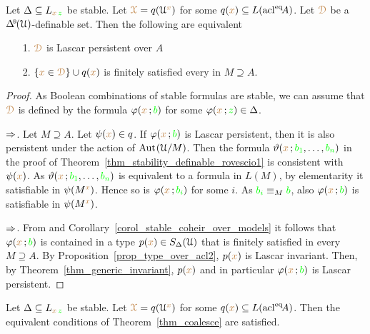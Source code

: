 \begin{corollary}\label{corol_persistent_finsat}
  Let $\Delta\subseteq L_{{\color{brown} x}\,{\color{green} z}}$ be stable.
  Let ${\color{brown}\EuScript X}= q(\EuScript U^{\color{brown} x})$ for some $q({\color{brown} x})\subseteq L({\rm acl}^{{\rm eq}}\!A)$.
  Let ${\color{brown}\EuScript D}$ be a $\BDelta(\U)$-definable set.
  Then the following are equivalent 
  \begin{itemize}
    \item[1.] ${\color{brown}\EuScript D}$ is Lascar persistent over $A$
    \item[2.] $\{{\color{brown} x}\in{\color{brown}\EuScript D}\}\cup q({\color{brown} x})$ is finitely satisfied every in $M\supseteq A$.
  \end{itemize}
\end{corollary}
\begin{proof}
  As Boolean combinations of stable formulas are stable, we can assume that ${\color{brown}\EuScript D}$ is defined by the formula $\varphi({\color{brown} x}\,;{\color{green} b})$ for some $\varphi({\color{brown} x}\,;{\color{green} z})\in\Delta$.

  $\Rightarrow$.
  Let $M\supseteq A$.
  Let $\psi({\color{brown} x})\in q$.
  If $\varphi({\color{brown} x}\,;{\color{green} b})$ is Lascar persistent, then it is also persistent under the action of ${\rm Aut\kern.15ex}(\EuScript U/M)$.
  Then the formula $\vartheta({\color{brown} x}\,;{\color{green} b_1},\dots,{\color{green} b_n})$ in the proof of Theorem~\ref{thm_stability_definable_rovescio1} is consistent with $\psi({\color{brown} x})$.
  As $\vartheta({\color{brown} x}\,;{\color{green} b_1},\dots,{\color{green} b_n})$ is equivalent to a formula in $L(M)$, by elementarity it satisfiable in $\psi(M^{\color{brown} x})$.
  Hence so is $\varphi({\color{brown} x}\,;{\color{green} b_i})$ for some $i$.
  As ${\color{green} b_i}\equiv_M{\color{green} b}$, also $\varphi({\color{brown} x}\,;{\color{green} b})$ is satisfiable in $\psi(M^{\color{brown} x})$.
  
  $\Rightarrow$.
  From  and Corollary~\ref{corol_stable_coheir_over_models} it follows that $\varphi({\color{brown} x}\,;{\color{green} b})$ is contained in a type $p({\color{brown} x})\in S_\Delta(\EuScript U)$ that is finitely satisfied in every $M\supseteq A$.
  By Proposition~\ref{prop_type_over_acl2}, $p({\color{brown} x})$ is Lascar invariant.
  Then, by Theorem~\ref{thm_generic_invariant}, $p({\color{brown} x})$ and in particular $\varphi({\color{brown} x}\,;{\color{green} b})$ is Lascar persistent.
\end{proof}

\begin{proposition}\label{prop_stable_lanscape}
  Let $\Delta\subseteq L_{{\color{brown} x}\,{\color{green} z}}$ be stable.
  Let ${\color{brown}\EuScript X}= q(\EuScript U^{\color{brown} x})$ for some $q({\color{brown} x})\subseteq L({\rm acl}^{{\rm eq}}\!A)$.
  Then the equivalent conditions of Theorem~\ref{thm_coalesce} are satisfied.
\end{proposition}

